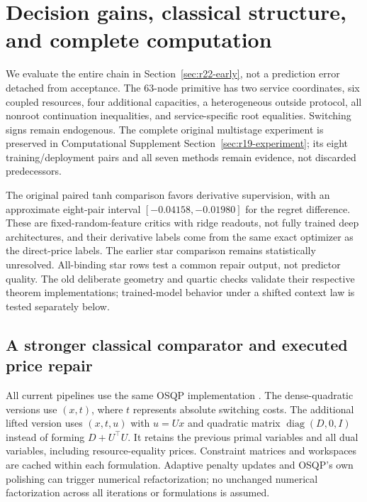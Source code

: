 \documentclass[11pt,letterpaper]{article}
\theoremstyle{definition}
\newcommand{\1}{\mathbf 1}
\begin{document}
\section{Decision gains, classical structure, and complete computation}\label{sec:r22-empirical}
We evaluate the entire chain in Section~\ref{sec:r22-early}, not a prediction error detached from acceptance. The 63-node primitive has two service coordinates, six coupled resources, four additional capacities, a heterogeneous outside protocol, all nonroot continuation inequalities, and service-specific root equalities. Switching signs remain endogenous. The complete original multistage experiment is preserved in Computational Supplement Section~\ref{sec:r19-experiment}; its eight training/deployment pairs and all seven methods remain evidence, not discarded predecessors.

The original paired tanh comparison favors derivative supervision, with an approximate eight-pair interval $[-0.04158,-0.01980]$ for the regret difference. These are fixed-random-feature critics with ridge readouts, not fully trained deep architectures, and their derivative labels come from the same exact optimizer as the direct-price labels. The earlier star comparison remains statistically unresolved. All-binding star rows test a common repair output, not predictor quality. The old deliberate geometry and quartic checks validate their respective theorem implementations; trained-model behavior under a shifted context law is tested separately below.

\subsection{A stronger classical comparator and executed price repair}
All current pipelines use the same OSQP implementation \citep{Stellato2020}. The dense-quadratic versions use $(x,t)$, where $t$ represents absolute switching costs. The additional lifted version uses $(x,t,u)$ with $u=Ux$ and quadratic matrix $\operatorname{diag}(D,0,I)$ instead of forming $D+U^\top U$. It retains the previous primal variables and all dual variables, including resource-equality prices. Constraint matrices and workspaces are cached within each formulation. Adaptive penalty updates and OSQP's own polishing can trigger numerical refactorization; no unchanged numerical factorization across all iterations or formulations is assumed.
\end{document}
